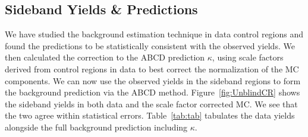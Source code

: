 \subsection{Sideband Yields \& Predictions}

We have studied the background estimation technique in data control regions and found the predictions to be statistically consistent with the observed yields. We then calculated the correction to the ABCD prediction $\kappa$, using scale factors derived from control regions in data to best correct the normalization of the MC components. We can now use the observed yields in the sideband regions to form the background prediction via the ABCD method. Figure~\ref{fig:UnblindCR} shows the sideband yields in both data and the scale factor corrected MC. We see that the two agree within statistical errors. Table~\ref{tab:tab} tabulates the data yields alongside the full background prediction including $\kappa$.

